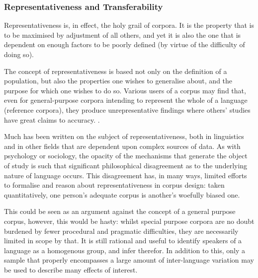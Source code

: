 




\subsubsection{Representativeness and Transferability}
Representativeness is, in effect, the holy grail of corpora.  It is the property that is to be maximised by adjustment of all others, and yet it is also the one that is dependent on enough factors to be poorly defined (by virtue of the difficulty of doing so).

The concept of representativeness is based not only on the definition of a population, but also the properties one wishes to generalise about, and the purpose for which one wishes to do so.  Various users of a corpus may find that, even for general-purpose corpora intending to represent the whole of a language (reference corpora), they produce unrepresentative findings where others' studies have great claims to accuracy. .

Much has been written on the subject of representativeness, both in linguistics and in other fields that are dependent upon complex sources of data.  As with psychology or sociology, the opacity of the mechanisms that generate the object of study is such that significant philosophical disagreement as to the underlying nature of language occurs.  This disagreement has, in many ways, limited efforts to formalise and reason about representativeness in corpus design: taken quantitatively, one person's adequate corpus is another's woefully biased one.

This could be seen as an argument against the concept of a general purpose corpus, however, this would be hasty: whilst special purpose corpora are no doubt burdened by fewer procedural and pragmatic difficulties, they are necessarily limited in scope by that.  It is still rational and useful to identify speakers of a language as a homogenous group, and infer therefor.  In addition to this, only a sample that properly encompasses a large amount of inter-language variation may be used to describe many effects of interest.

